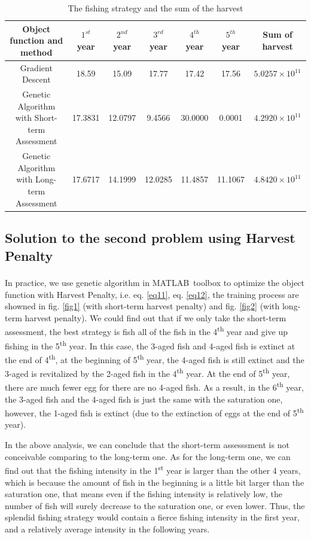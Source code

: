 \documentclass{IEEEtran}
\begin{document}
\begin{table}
    \normalsize
    \caption{The fishing strategy and the sum of the harvest}
    \label{tab1}
    \begin{tabular}{ccccccc}\toprule
        Object function and method & $1^{st}$ year & $2^{nd}$ year & $3^{rd}$ year & $4^{th}$ year & $5^{th}$ year & Sum of harvest \\ 
        \midrule
        Gradient Descent & 18.59 & 15.09 & 17.77 & 17.42 & 17.56 & $5.0257\times10^{11}$\\
        Genetic Algorithm with Short-term Assessment & 17.3831 & 12.0797 & 9.4566 & 30.0000 & 0.0001 & $4.2920\times10^{11}$\\ 
        Genetic Algorithm with Long-term Assessment & 17.6717 & 14.1999 & 12.0285 & 11.4857 & 11.1067 & $4.8420\times10^{11}$\\
        \bottomrule
    \end{tabular} 
\end{table}

\subsection{Solution to the second problem using Harvest Penalty}

In practice, we use genetic algorithm in MATLAB\textsuperscript\textregistered \ toolbox\textsuperscript{\cite{MATLABOptimizationToolbox}} to optimize the object function with Harvest Penalty, i.e. eq. \ref{eq11}, eq. \ref{eq12}, the training process are showned in fig. \ref{fig1} (with short-term harvest penalty) and fig. \ref{fig2} (with long-term harvest penalty). We could find out that if we only take the short-term assessment, the best strategy is fish all of the fish in the 4\textsuperscript{th} year and give up fishing in the 5\textsuperscript{th} year. In this case, the 3-aged fish and 4-aged fish is extinct at the end of 4\textsuperscript{th}, at the beginning of 5\textsuperscript{th} year, the 4-aged fish is still extinct and the 3-aged is revitalized by the 2-aged fish in the 4\textsuperscript{th} year. At the end of 5\textsuperscript{th} year, there are much fewer egg for there are no 4-aged fish. As a result, in the 6\textsuperscript{th} year, the 3-aged fish and the 4-aged fish is just the same with the saturation one, however, the 1-aged fish is extinct (due to the extinction of eggs at the end of 5\textsuperscript{th} year). 

In the above analysis, we can conclude that the short-term assesssment is not conceivable comparing to the long-term one. As for the long-term one, we can find out that the fishing intensity in the 1\textsuperscript{st} year is larger than the other 4 years, which is because the amount of fish in the beginning is a little bit larger than the saturation one, that means even if the fishing intensity is relatively low, the number of fish will surely decrease to the saturation one, or even lower. Thus, the splendid fishing strategy would contain a fierce fishing intensity in the first year, and a relatively average intensity in the following years. 
\end{document}
